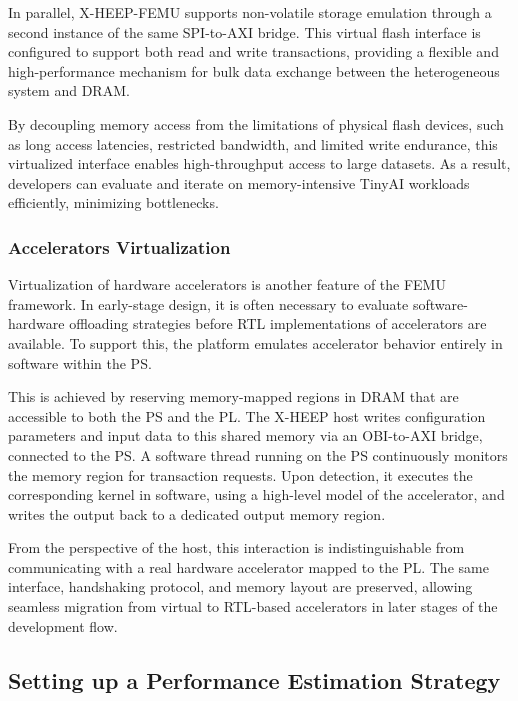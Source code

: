                 In parallel, \mbox{X-HEEP-FEMU} supports non-volatile storage emulation through a second instance of the same SPI-to-AXI bridge. This virtual flash interface is configured to support both read and write transactions, providing a flexible and high-performance mechanism for bulk data exchange between the heterogeneous system and DRAM.
                
                By decoupling memory access from the limitations of physical flash devices, such as long access latencies, restricted bandwidth, and limited write endurance, this virtualized interface enables high-throughput access to large datasets. As a result, developers can evaluate and iterate on memory-intensive TinyAI workloads efficiently, minimizing bottlenecks.
            
            \subsubsection*{Accelerators Virtualization}
            
                Virtualization of hardware accelerators is another feature of the \mbox{FEMU} framework. In early-stage design, it is often necessary to evaluate software-hardware offloading strategies before RTL implementations of accelerators are available. To support this, the platform emulates accelerator behavior entirely in software within the PS.
                
                This is achieved by reserving memory-mapped regions in DRAM that are accessible to both the PS and the PL. The \mbox{X-HEEP} host writes configuration parameters and input data to this shared memory via an OBI-to-AXI bridge, connected to the PS. A software thread running on the PS continuously monitors the memory region for transaction requests. Upon detection, it executes the corresponding kernel in software, using a high-level model of the accelerator, and writes the output back to a dedicated output memory region.
                
                From the perspective of the host, this interaction is indistinguishable from communicating with a real hardware accelerator mapped to the PL. The same interface, handshaking protocol, and memory layout are preserved, allowing seamless migration from virtual to RTL-based accelerators in later stages of the development flow.

        \subsection{Setting up a Performance Estimation Strategy}
        
